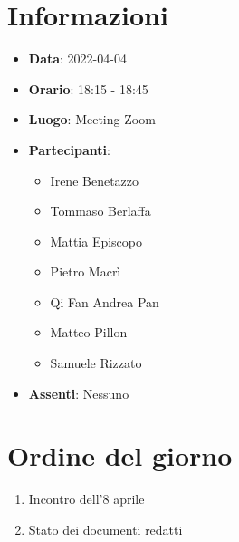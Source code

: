     \section{Informazioni}
    \begin{itemize}
        \item \textbf{Data}: 2022-04-04        %
        \item \textbf{Orario}: 18:15 - 18:45   %
        \item \textbf{Luogo}: Meeting Zoom
        \item \textbf{Partecipanti}:
        \begin{itemize}
            \item Irene Benetazzo
            \item Tommaso Berlaffa
            \item Mattia Episcopo
            \item Pietro Macrì
            \item Qi Fan Andrea Pan
            \item Matteo Pillon
            \item Samuele Rizzato
        \end{itemize}
        \item \textbf{Assenti}:
        Nessuno
    \end{itemize}
    \section{Ordine del giorno}
    \begin{enumerate}
        \item Incontro dell'8 aprile
        \item Stato dei documenti redatti
    \end{enumerate}
    \newpage